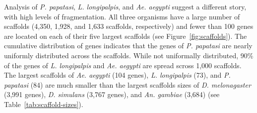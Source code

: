 Analysis of \emph{P. papatasi}, \emph{L. longipalpis}, and \emph{Ae. aegypti} suggest a different story, with high levels of fragmentation.  All three organisms have a large number of scaffolds (4,350, 1,928, and 1,633 scaffolds, respectively) and fewer than 100 genes are located on each of their five largest scaffolds (see Figure~\ref{fig:scaffolds}).  The cumulative distribution of genes indicates that the genes of \emph{P. papatasi} are nearly uniformly distributed across the scaffolds.  While not uniformally distributed, 90\% of the genes of \emph{L. longipalpis} and \emph{Ae. aegypti} are spread scross 1,000 scaffolds. The largest scaffolds of \emph{Ae. aegypti} (104 genes), \emph{L. longipalpis} (73), and \emph{P. papatasi} (84) are much smaller than the largest scaffolds sizes of \emph{D. melonagaster} (3,991 genes), \emph{D. simulans} (3,767 genes), and \emph{An. gambiae} (3,684) (see Table~\ref{tab:scaffold-sizes}).

